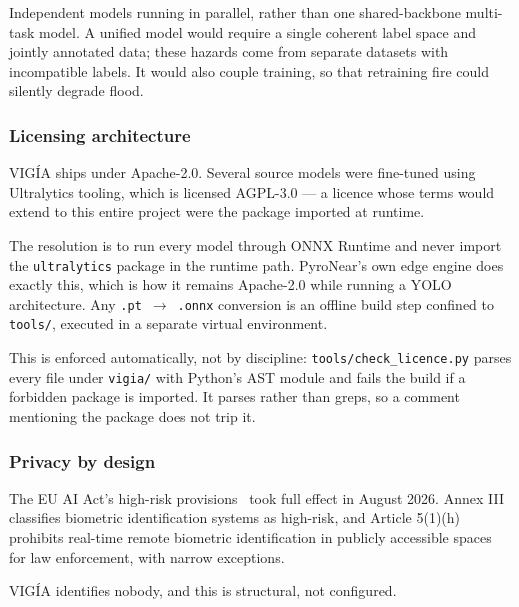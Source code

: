 Independent models running in parallel, rather than one shared-backbone
multi-task model. A unified model would require a single coherent label space
and jointly annotated data; these hazards come from separate datasets with
incompatible labels. It would also couple training, so that retraining fire
could silently degrade flood.

\subsubsection{Licensing architecture}
\label{sec:licensing}

VIGÍA ships under Apache-2.0. Several source models were fine-tuned using
Ultralytics tooling, which is licensed AGPL-3.0 — a licence whose terms would
extend to this entire project were the package imported at runtime.

The resolution is to run every model through ONNX Runtime and never import the
\texttt{ultralytics} package in the runtime path. PyroNear's own edge engine
does exactly this, which is how it remains Apache-2.0 while running a YOLO
architecture. Any \texttt{.pt}~$\rightarrow$~\texttt{.onnx} conversion is an
offline build step confined to \texttt{tools/}, executed in a separate virtual
environment.

This is enforced automatically, not by discipline:
\texttt{tools/check\_licence.py} parses every file under \texttt{vigia/} with
Python's AST module and fails the build if a forbidden package is imported. It
parses rather than greps, so a comment mentioning the package does not trip
it.

\subsubsection{Privacy by design}
\label{sec:privacy}

The EU AI Act's high-risk provisions~\citep{euaiact} took full effect in
August 2026. Annex III classifies biometric identification systems as
high-risk, and Article 5(1)(h) prohibits real-time remote biometric
identification in publicly accessible spaces for law enforcement, with narrow
exceptions.

VIGÍA identifies nobody, and this is structural, not configured.

